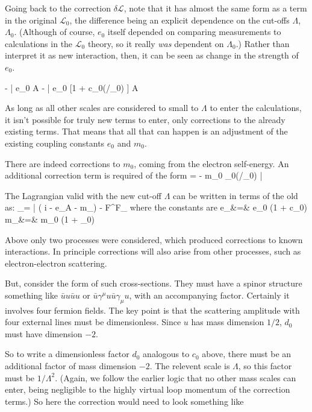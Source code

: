Going back to the correction $\delta \mathcal{L}$, note that it has almost the same form as a term in the original $\mathcal{L}_0$, the difference being an explicit dependence on the cut-offs $\Lambda$, $\Lambda_0$.  (Although of course, $e_0$ itself depended on comparing measurements to calculations in the $\mathcal{L}_0$ theory, so it really {\it was} dependent on $\Lambda_0$.)  Rather than interpret it as new interaction, then, it can be seen as change in the strength of $e_0$.  

\beq
 - \bar{\Psi} e_0 A \cdot \gamma  \Psi \to - \bar{\Psi} e_0  [1 + c_0(\Lambda/\Lambda_0) ] A \cdot \gamma  \Psi
\eeq 

As long as all other scales are considered to small to $\Lambda$ to enter the calculations, it isn't possible for truly new terms to enter, only corrections to the already existing terms.  That means that all that can happen is an adjustment of the existing coupling constants $e_0$ and $m_0$.

There are indeed corrections to $m_0$, coming from the electron self-energy.  An additional correction term is required of the form
\beq
	\delta {} = - m_0  _0(\Lambda/\Lambda_0) \bar{\Psi} \Psi
\eeq

The Lagrangian valid with the new cut-off $\Lambda$ can be written in terms of the old as:
\beq
	_\Lambda = 
		\bar{\Psi} \left( i \partial \cdot \gamma - e_\Lambda A \cdot \gamma - m_\Lambda \right) \Psi -  F^{\mu\nu}F_{\mu\nu} 
\eeq 
where the constants are
\beqa
	e_\Lambda &=& e_0 (1 + c_0)				\\
	m_\Lambda &=& m_0 (1 + _0)
\eeqa


Above only two processes were considered, which produced corrections to known interactions.  In principle corrections will also arise from other processes, such as electron-electron scattering.

But, consider the form of such cross-sections.  They must have a spinor structure something like $\bar{u}u \bar{u} u$ or $\bar{u}\gamma^\mu u \bar{u} \gamma_\mu u$, with an accompanying factor.  Certainly it involves four fermion fields.  The key point is that the scattering amplitude with four external lines must be dimensionless.  Since $u$ has mass dimension $1/2$, $d_0$ must have dimension $-2$.  

So to write a dimensionless factor $d_0$ analogous to $c_0$ above, there must be an additional factor of mass dimension $-2$.  The relevent scale is $\Lambda$, so this factor must be $1/\Lambda^2$.  (Again, we follow the earlier logic that no other mass scales can enter, being negligible to the highly virtual loop momentum of the correction terms.)  So here the correction would need to look something like

